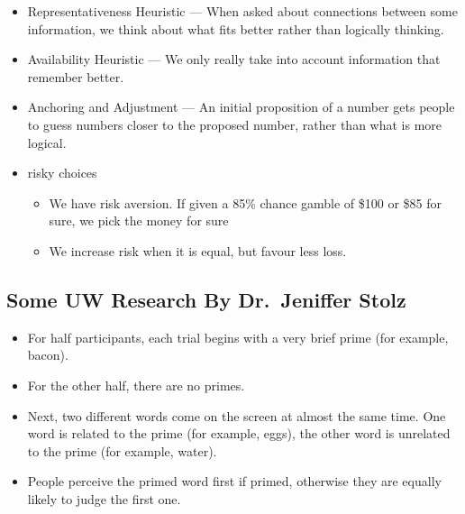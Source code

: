 \documentclass[12pt]{article}
\begin{document}
\begin{itemize}
	\item Representativeness Heuristic ---
		When asked  about connections between some information, we think about
		what fits better rather than logically thinking.
	\item Availability Heuristic --- We only really take into account
		information that remember better.
	\item Anchoring and Adjustment --- An initial proposition of a number gets
		people to guess numbers closer to the proposed number, rather than what
		is more logical.
	\item risky choices
		\begin{itemize}
			\item We have risk aversion. If given a 85\% chance gamble of \$100
				or \$85 for sure, we pick the money for sure
			\item We increase risk when it is equal, but favour less loss.
		\end{itemize}
\end{itemize}

\subsection{Some UW Research By Dr.\ Jeniffer Stolz}

\begin{itemize}
	\item For half participants, each trial begins with a very brief prime (for
		example, bacon).
	\item For the other half, there are no primes.
	\item Next, two different words come on the screen at almost the same time.
		One word is related to the prime (for example, eggs), the other word is
		unrelated to the prime (for example, water).
	\item People perceive the primed word first if primed, otherwise they are
		equally likely to judge the first one.
\end{itemize}
\end{document}
